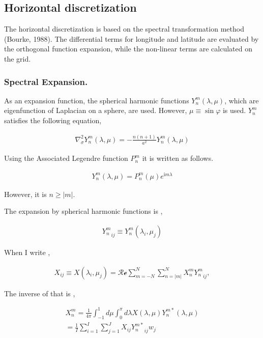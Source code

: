 \hypertarget{horizontal-discretization}{%
\subsection{Horizontal discretization}\label{horizontal-discretization}}

The horizontal discretization is based on the spectral transformation
method (Bourke, 1988). The differential terms for longitude and latitude
are evaluated by the orthogonal function expansion, while the non-linear
terms are calculated on the grid.

\hypertarget{spectral-expansion.}{%
\subsubsection{Spectral Expansion.}\label{spectral-expansion.}}

As an expansion function, the spherical harmonic functions
\(Y_n^m(\lambda,\mu)\), which are eigenfunction of Laplacian on a
sphere, are used. However, \(\mu \equiv \sin\varphi\) is used. \(Y_n^m\)
satisfies the following equation,

\begin{eqnarray}
\nabla^{2}_{\sigma} Y_n^m(\lambda,\mu)
= - \frac{n(n+1)}{a^{2}} Y_n^m(\lambda,\mu)
\end{eqnarray}

Using the Associated Legendre function \(P_n^m\) it is written as
follows.

\begin{eqnarray}
Y_n^m(\lambda,\mu) = P_n^m (\mu) e^{\mathrm{i}m \lambda}
\end{eqnarray}

However, it is \(n \geq | m |\).

The expansion by spherical harmonic functions is ,

\begin{eqnarray}
   {Y_n^m}_{ij} \equiv Y_n^m ( \lambda_i, \mu_j )
\end{eqnarray}

When I write ,

\begin{eqnarray}
  X_{ij} \equiv X ( \lambda_i, \mu_j )
   =  \mathcal{Re} \sum_{m=-N}^{N} \sum_{n=|m|}^{N}
        X_n^m {Y_n^m}_{ij} ,
\end{eqnarray}

The inverse of that is ,

\begin{eqnarray}
  X_n^m
         =  \frac{1}{4 \pi}
             \int_{-1}^{1} d \mu \int_{0}^{\pi} d \lambda
               X( \lambda, \mu ) Y_n^{m *} ( \lambda, \mu ) \\
         =  \frac{1}{I} \sum_{i=1}^{I} \sum_{j=1}^{J}  
               X_{ij} {Y_n^{m*}}_{ij} w_j
\end{eqnarray}

